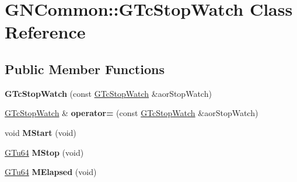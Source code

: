 \hypertarget{class_g_n_common_1_1_g_tc_stop_watch}{}\section{G\+N\+Common\+:\+:G\+Tc\+Stop\+Watch Class Reference}
\label{class_g_n_common_1_1_g_tc_stop_watch}
\subsection*{Public Member Functions}
\begin{DoxyCompactItemize}
\item 
\mbox{\label{class_g_n_common_1_1_g_tc_stop_watch_ae442c6e313df8f2ad22b4ceef71b89ab}} 
{\bfseries G\+Tc\+Stop\+Watch} (const \mbox{\hyperlink{class_g_n_common_1_1_g_tc_stop_watch}{G\+Tc\+Stop\+Watch}} \&aor\+Stop\+Watch)
\item 
\mbox{\label{class_g_n_common_1_1_g_tc_stop_watch_a334776e4f98289f2093b2da4cf3cb8b8}} 
\mbox{\hyperlink{class_g_n_common_1_1_g_tc_stop_watch}{G\+Tc\+Stop\+Watch}} \& {\bfseries operator=} (const \mbox{\hyperlink{class_g_n_common_1_1_g_tc_stop_watch}{G\+Tc\+Stop\+Watch}} \&aor\+Stop\+Watch)
\item 
\mbox{\label{class_g_n_common_1_1_g_tc_stop_watch_ad62dfcb669827907489089ff31be6325}} 
void {\bfseries M\+Start} (void)
\item 
\mbox{\label{class_g_n_common_1_1_g_tc_stop_watch_ac9d0bf8c49268056b6b4d9486fdaade6}} 
\mbox{\hyperlink{namespace_g_n_common_a01e8527dabf7ab4f123156b0701945eb}{G\+Tu64}} {\bfseries M\+Stop} (void)
\item 
\mbox{\label{class_g_n_common_1_1_g_tc_stop_watch_a2fdbb8f6ed275c1601c2b52a530fd045}} 
\mbox{\hyperlink{namespace_g_n_common_a01e8527dabf7ab4f123156b0701945eb}{G\+Tu64}} {\bfseries M\+Elapsed} (void)
\end{DoxyCompactItemize}
